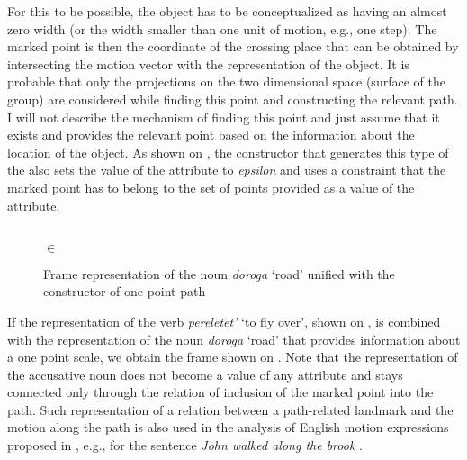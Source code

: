 For this to be possible, the object has to be conceptualized as having an almost zero width (or the width smaller than one unit of motion, e.g., one step). The marked point is then the coordinate of the crossing place that can be obtained by intersecting the motion vector with the representation of the object. It is probable that only the projections on the two dimensional space (surface of the group) are considered while finding this point and constructing the relevant path. I will not describe the mechanism of finding this point and just assume that it exists and provides the relevant point based on the information about the location of the object. As shown on , the constructor that generates this type of the  also sets the value of the \WIDTH attribute to \textit{epsilon} and uses a constraint that the marked point has to belong to the set of points provided as a value of the \LOC attribute.

\begin{figure}
\begin{minipage}{0.31\textwidth}
\end{minipage}\hfill%
\begin{minipage}{0.6\textwidth}\centering
{}\\
 $\in$ 
\end{minipage}
\caption{Frame representation of the noun \textit{doroga} `road' unified with the constructor of one point path \label{frame:road:point}}
\end{figure}

If the representation of the verb \textit{pereletet'} `to fly over', shown on , is combined with the representation of the noun \textit{doroga} `road' that provides information about a one point scale, we obtain the frame shown on . Note that the representation of the accusative noun does not become a value of any attribute and stays connected only through the relation of inclusion of the marked point into the path. Such representation of a relation between a path-related landmark and the motion along the path is also used in the analysis of English motion expressions proposed in \citealt{KallmeyerOsswald:13}, e.g., for the sentence \textit{John walked along the brook} \citep[32, Figure~23]{KallmeyerOsswald:13}.

